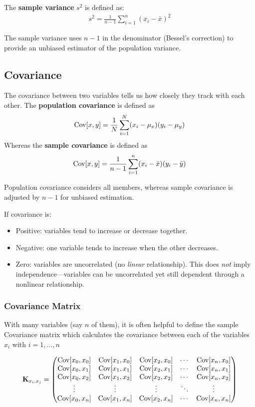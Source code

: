 The \textbf{sample variance} $s^2$ is defined as:
\begin{align}
s^2 = \frac{1}{n-1}\sum_{i=1}^n(x_i - \bar{x})^2
\end{align}

The sample variance uses $n-1$ in the denominator (Bessel's correction) to provide an unbiased estimator of the population variance.

\subsection{Covariance}
The covariance between two variables tells us how closely they track with each other. The \textbf{population covariance} is defined as
\begin{align}
\mathrm{Cov}[x,y] = \frac{1}{N}\sum_{i=1}^N (x_i-\mu_x)(y_i-\mu_y)
\end{align}
Whereas the \textbf{sample covariance} is defined as 
\begin{align}
	\mathrm{Cov}[x,y] = \frac{1}{n-1}\sum_{i=1}^n (x_i-\bar{x})(y_i-\bar{y})
\end{align}

Population covariance considers all members, whereas sample covariance is adjusted by $n-1$ for unbiased estimation.

If covariance is:
\begin{itemize}
    \item Positive: variables tend to increase or decrease together.
    \item Negative: one variable tends to increase when the other decreases.
    \item Zero: variables are uncorrelated (no \emph{linear} relationship). This does \emph{not} imply independence---variables can be uncorrelated yet still dependent through a nonlinear relationship.
\end{itemize}

\subsubsection{Covariance Matrix}\label{covmat}
With many variables (say $n$ of them), it is often helpful to define the sample Covariance matrix which calculates the covariance between each of the variables $x_i$ with $i = 1,\dots, n$

\begin{align}
\textbf{K}_{x_i,x_j} = \begin{pmatrix} 
                             \mathrm{Cov}[x_0,x_0]&\mathrm{Cov}[x_1,x_0]&\mathrm{Cov}[x_2,x_0]&\cdots &\mathrm{Cov}[x_n,x_0]\\
                             \mathrm{Cov}[x_0,x_1]&\mathrm{Cov}[x_1,x_1]&\mathrm{Cov}[x_2,x_1]&\cdots &\mathrm{Cov}[x_n,x_1]\\
                             \mathrm{Cov}[x_0,x_2]&\mathrm{Cov}[x_1,x_2]&\mathrm{Cov}[x_2,x_2]&\cdots &\mathrm{Cov}[x_n,x_2]\\
                             \vdots&\vdots&\vdots&\ddots&\vdots\\
                             \mathrm{Cov}[x_0,x_n]&\mathrm{Cov}[x_1,x_n]&\mathrm{Cov}[x_2,x_n]&\cdots &\mathrm{Cov}[x_n,x_n] \end{pmatrix}
\end{align}


